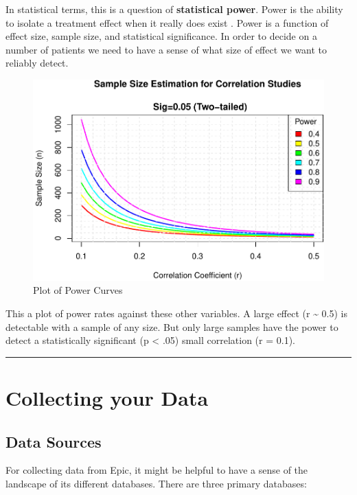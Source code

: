 \documentclass[
]{report}
\begin{document}
In statistical terms, this is a question of \textbf{statistical power}.
Power is the ability to isolate a treatment effect when it really does
exist \citep{Cohen1988}. Power is a function of effect size, sample
size, and statistical significance. In order to decide on a number of
patients we need to have a sense of what size of effect we want to
reliably detect.

\begin{figure}
\centering
\includegraphics{index_files/figure-latex/power-1.pdf}
\caption{Plot of Power Curves}
\end{figure}

This a plot of power rates against these other variables. A large effect
(r \textasciitilde{} 0.5) is detectable with a sample of any size. But
only large samples have the power to detect a statistically significant
(p \textless{} .05) small correlation (r = 0.1).

\begin{center}\rule{0.5\linewidth}{0.5pt}\end{center}

\hypertarget{collecting-your-data}{%
\chapter{Collecting your Data}\label{collecting-your-data}}

\hypertarget{data-sources}{%
\section{Data Sources}\label{data-sources}}

For collecting data from Epic, it might be helpful to have a sense of
the landscape of its different databases. There are three primary
databases:
\end{document}
